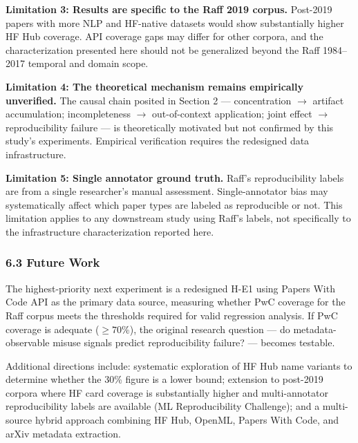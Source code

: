 \textbf{Limitation 3: Results are specific to the Raff 2019 corpus.} Post-2019 papers with more NLP and HF-native datasets would show substantially higher HF Hub coverage. API coverage gaps may differ for other corpora, and the characterization presented here should not be generalized beyond the Raff 1984--2017 temporal and domain scope.

\textbf{Limitation 4: The theoretical mechanism remains empirically unverified.} The causal chain posited in Section 2 --- concentration $\rightarrow$ artifact accumulation; incompleteness $\rightarrow$ out-of-context application; joint effect $\rightarrow$ reproducibility failure --- is theoretically motivated but not confirmed by this study's experiments. Empirical verification requires the redesigned data infrastructure.

\textbf{Limitation 5: Single annotator ground truth.} Raff's reproducibility labels are from a single researcher's manual assessment. Single-annotator bias may systematically affect which paper types are labeled as reproducible or not. This limitation applies to any downstream study using Raff's labels, not specifically to the infrastructure characterization reported here.

\subsubsection{6.3 Future Work}

The highest-priority next experiment is a redesigned H-E1 using Papers With Code API as the primary data source, measuring whether PwC coverage for the Raff corpus meets the thresholds required for valid regression analysis. If PwC coverage is adequate ($\geq 70$\%), the original research question --- do metadata-observable misuse signals predict reproducibility failure? --- becomes testable.

Additional directions include: systematic exploration of HF Hub name variants to determine whether the 30\% figure is a lower bound; extension to post-2019 corpora where HF card coverage is substantially higher and multi-annotator reproducibility labels are available (ML Reproducibility Challenge); and a multi-source hybrid approach combining HF Hub, OpenML, Papers With Code, and arXiv metadata extraction.


